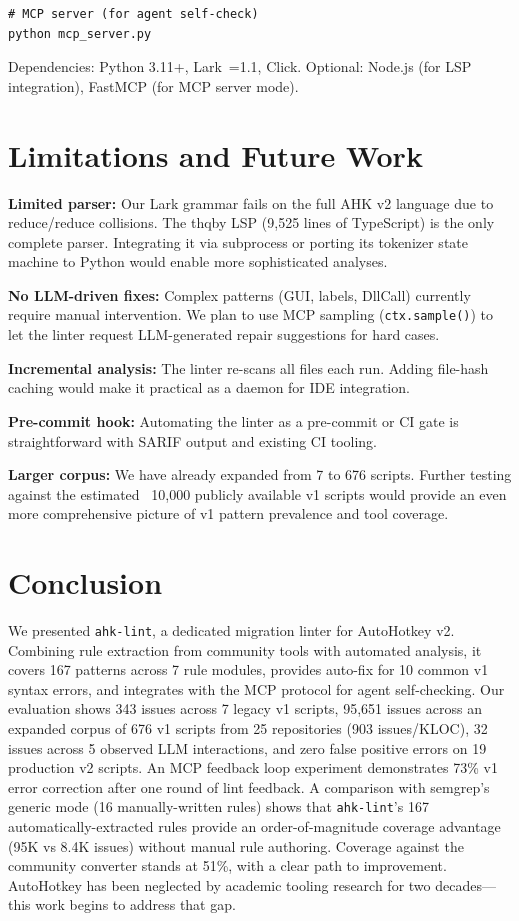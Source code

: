 \documentclass[11pt,a4paper]{article}
\begin{document}
\begin{enumerate}
\begin{lstlisting}[style=ahk,frame=none,numbers=none]
# MCP server (for agent self-check)
python mcp_server.py
\end{lstlisting}

Dependencies: Python 3.11+, Lark~=1.1, Click. Optional: Node.js (for LSP integration), FastMCP (for MCP server mode).

\section{Limitations and Future Work}

\textbf{Limited parser:} Our Lark grammar fails on the full AHK v2 language due to reduce/reduce collisions. The thqby LSP (9,525 lines of TypeScript) is the only complete parser. Integrating it via subprocess or porting its tokenizer state machine to Python would enable more sophisticated analyses.

\textbf{No LLM-driven fixes:} Complex patterns (GUI, labels, DllCall) currently require manual intervention. We plan to use MCP sampling (\texttt{ctx.sample()}) to let the linter request LLM-generated repair suggestions for hard cases.

\textbf{Incremental analysis:} The linter re-scans all files each run. Adding file-hash caching would make it practical as a daemon for IDE integration.

\textbf{Pre-commit hook:} Automating the linter as a pre-commit or CI gate is straightforward with SARIF output and existing CI tooling.

\textbf{Larger corpus:} We have already expanded from 7 to 676 scripts. Further testing against the estimated ~10,000 publicly available v1 scripts would provide an even more comprehensive picture of v1 pattern prevalence and tool coverage.

\section{Conclusion}

We presented \texttt{ahk-lint}, a dedicated migration linter for AutoHotkey v2. Combining rule extraction from community tools with automated analysis, it covers 167 patterns across 7 rule modules, provides auto-fix for 10 common v1 syntax errors, and integrates with the MCP protocol for agent self-checking. Our evaluation shows 343 issues across 7 legacy v1 scripts, 95,651 issues across an expanded corpus of 676 v1 scripts from 25 repositories (903 issues/KLOC), 32 issues across 5 observed LLM interactions, and zero false positive errors on 19 production v2 scripts. An MCP feedback loop experiment demonstrates 73\% v1 error correction after one round of lint feedback. A comparison with semgrep's generic mode (16 manually-written rules) shows that \texttt{ahk-lint}'s 167 automatically-extracted rules provide an order-of-magnitude coverage advantage (95K vs 8.4K issues) without manual rule authoring. Coverage against the community converter stands at 51\%, with a clear path to improvement. AutoHotkey has been neglected by academic tooling research for two decades---this work begins to address that gap.


\end{enumerate}
\end{document}
